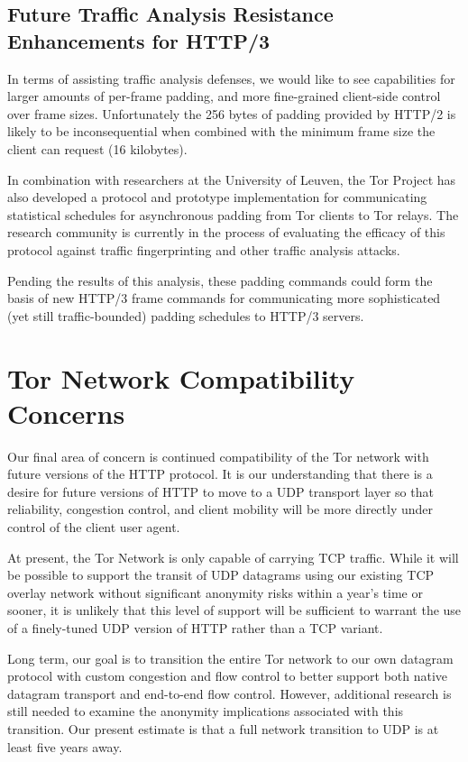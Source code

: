 \documentclass[letterpaper,11pt]{llncs}
\begin{document}
\subsection{Future Traffic Analysis Resistance Enhancements for HTTP/3}

In terms of assisting traffic analysis defenses, we would like to see
capabilities for larger amounts of per-frame padding, and more fine-grained
client-side control over frame sizes. Unfortunately the 256 bytes of padding
provided by HTTP/2 is likely to be inconsequential when combined with the
minimum frame size the client can request (16 kilobytes).

In combination with researchers at the University of Leuven, the Tor Project
has also developed a protocol\cite{multihop-padding} and prototype
implementation\cite{wfpadtools} for communicating statistical schedules for
asynchronous padding from Tor clients to Tor relays.  The research community
is currently in the process of evaluating the efficacy of this protocol
against traffic fingerprinting and other traffic analysis attacks.

Pending the results of this analysis, these padding commands could form the
basis of new HTTP/3 frame commands for communicating more sophisticated (yet
still traffic-bounded) padding schedules to HTTP/3 servers.


\section{Tor Network Compatibility Concerns}

Our final area of concern is continued compatibility of the Tor network with
future versions of the HTTP protocol. It is our understanding that there is a
desire for future versions of HTTP to move to a UDP transport layer so that
reliability, congestion control, and client mobility will be more directly
under control of the client user agent.

At present, the Tor Network is only capable of carrying TCP traffic. While it
will be possible to support the transit of UDP datagrams using our existing
TCP overlay network without significant anonymity risks within a year's time
or sooner, it is unlikely that this level of support will be sufficient to
warrant the use of a finely-tuned UDP version of HTTP rather than a TCP
variant.

Long term, our goal is to transition the entire Tor network to our own
datagram protocol with custom congestion and flow control to better support
both native datagram transport and end-to-end flow control. However,
additional research is still needed to examine the anonymity implications
associated with this transition\cite{tor-udp}. Our present estimate is that a
full network transition to UDP is at least five years away.
\end{document}
